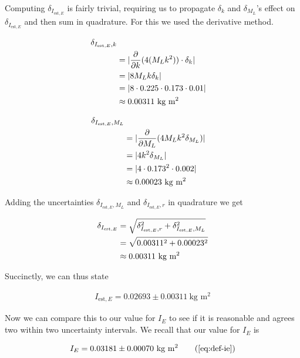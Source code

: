 \documentclass[coverpage]{article}
\newcommand{\iUnit}{\text{kg $\text{m}^2$}}
\begin{document}
	Computing $\delta_{I_{\text{est}, E}}$ is fairly trivial, requiring us to propagate $\delta_k$ and $\delta_{M_L}$'s effect on $\delta_{I_{\text{est}, E}}$ and then sum in quadrature. For this we used the derivative method.
	
	\begin{align}
		\delta_{I_{\text{est}, E}, k} \notag \\
		&= |\frac{\partial}{\partial k} (4 (M_L k^2)) \cdot \delta_k| \notag \\
		&= |8 M_L k \delta_k| \notag \\
		&= |8 \cdot 0.225 \cdot 0.173 \cdot 0.01| \notag \\
		&\approx 0.00311\ \iUnit
	\end{align}
	
	\begin{align}
		\delta_{I_{\text{est}, E}, M_L} \notag \\
		&= |\frac{\partial}{\partial M_L} (4 M_L k^2 \delta_{M_L})| \notag \\
		&= |4 k^2 \delta_{M_L}| \notag \\
		&= |4 \cdot 0.173^2 \cdot 0.002| \notag \\
		&\approx 0.00023\ \iUnit
	\end{align}
	
	Adding the uncertainties $\delta_{I_{\text{est}, E}, M_L}$ and $\delta_{I_{\text{est}, E}, r}$ in quadrature we get
	
	\begin{align}
		\delta_{I_{\text{est}, E}} &= \sqrt{\delta_{I_{\text{est}, E}, r}^2 + \delta_{I_{\text{est}, E}, M_L}^2} \notag \\
		&= \sqrt{0.00311^2 + 0.00023^2} \notag \\
		&\approx 0.00311\ \iUnit
	\end{align}

	Succinctly, we can thus state
	
	\begin{align}
		I_{\text{est}, E} = 0.02693 \pm 0.00311\ \iUnit
	\end{align}

	Now we can compare this to our value for $I_E$ to see if it is reasonable and agrees two within two uncertainty intervals. We recall that our value for $I_E$ is
	
	\begin{align}
		I_E = 0.03181 \pm 0.00070\ \iUnit \tag{\ref{eq:def-ie}}
	\end{align} 
\end{document}
